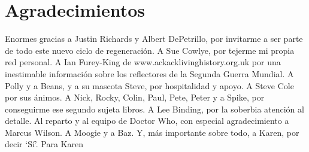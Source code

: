 \chapter*{Agradecimientos}

Enormes gracias a Justin Richards y Albert DePetrillo, por invitarme a ser parte de todo este nuevo ciclo de regeneración.
A Sue Cowlye, por tejerme mi propia red personal.
A Ian Furey-King de www.ackacklivinghistory.org.uk por una inestimable información sobre los reflectores de la Segunda Guerra Mundial.
A Polly y a Beans, y a su mascota Steve, por hospitalidad y apoyo.
A Steve Cole por sus ánimos.
A Nick, Rocky, Colin, Paul, Pete, Peter y a Spike, por conseguirme ese segundo sujeta libros.
A Lee Binding, por la soberbia atención al detalle.
Al reparto y al equipo de Doctor Who, con especial agradecimiento a Marcus Wilson.
A Moogie y a Baz.
Y, más importante sobre todo, a Karen, por decir ‘Sí’.
Para Karen
